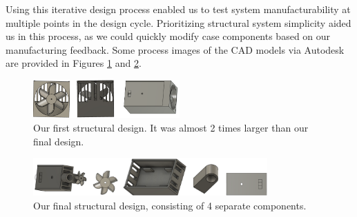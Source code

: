 \documentclass[11pt]{article}
\begin{document}
Using this iterative design process enabled us to test system manufacturability at multiple points in the design cycle. Prioritizing structural system simplicity aided us in this process, as we could quickly modify case components based on our manufacturing feedback. Some process images of the CAD models via Autodesk are provided in Figures \ref{fig:firstStructuralDesign} and \ref{fig:finalStructuralDesign}.

\begin{figure}[h]
    \centering
    \includegraphics[width=0.5\textwidth]{firstStructuralDesign}
    \caption{Our first structural design. It was almost 2 times larger than our final design.}
    \label{fig:firstStructuralDesign}
\end{figure}
\begin{figure}[h]
    \centering
    \includegraphics[width=0.8\textwidth]{finalStructuralDesign}
    \caption{Our final structural design, consisting of 4 separate components.}
    \label{fig:finalStructuralDesign}
\end{figure}
\end{document}
